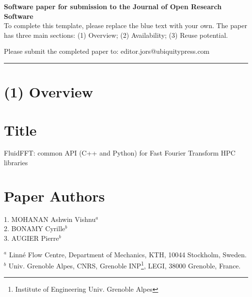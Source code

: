 \documentclass{../jors}
\begin{document}
{\bf Software paper for submission to the Journal of Open Research Software} \\

To complete this template, please replace the blue text with your own. The
paper has three main sections: (1) Overview; (2) Availability; (3) Reuse
potential.

Please submit the completed paper to: editor.jors@ubiquitypress.com

\rule{\textwidth}{1pt}

\section*{(1) Overview}

\vspace{0.5cm}

\section*{Title}


FluidFFT: common API (C++ and Python) for Fast Fourier Transform HPC libraries

\section*{Paper Authors}


1. MOHANAN Ashwin Vishnu$^a$\\
2. BONAMY Cyrille$^b$\\
3. AUGIER Pierre$^b$\\

\smallskip

$^a$ Linn\'e Flow Centre, Department of Mechanics, KTH, 10044 Stockholm, Sweden.
$^b$ Univ. Grenoble Alpes, CNRS, Grenoble INP\footnote{Institute of Engineering
Univ. Grenoble Alpes}, LEGI, 38000 Grenoble, France.\\
\end{document}
